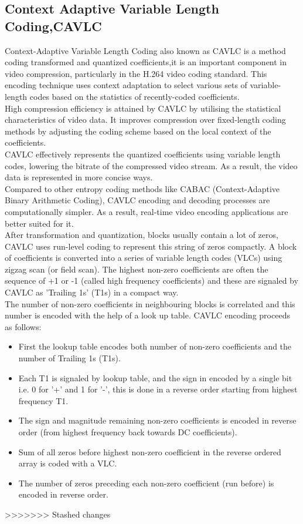 \subsection{Context Adaptive Variable Length Coding,CAVLC}
Context-Adaptive Variable Length Coding also known as CAVLC is a method coding transformed and quantized coefficients,it is an important component in video compression, particularly in the H.264 video coding standard. This encoding technique uses context adaptation to select various sets of variable-length codes based on the statistics of recently-coded coefficients.\\
High compression efficiency is attained by CAVLC by utilising the statistical characteristics of video data. It improves compression over fixed-length coding methods by adjusting the coding scheme based on the local context of the coefficients.\\
CAVLC effectively represents the quantized coefficients using variable length codes, lowering the bitrate of the compressed video stream. As a result, the video data is represented in more concise ways.\\
Compared to other entropy coding methods like CABAC (Context-Adaptive Binary Arithmetic Coding), CAVLC encoding and decoding processes are computationally simpler. As a result, real-time video encoding applications are better suited for it.\\
After transformation and quantization, blocks usually contain a lot of zeros, CAVLC uses run-level coding to represent this string of zeros compactly. A block of coefficients is converted into a series of variable length codes (VLCs) using zigzag scan (or field scan). The highest non-zero coefficients are often the sequence of +1 or -1 (called high frequency coefficients) and these are signaled by CAVLC as 'Trailing 1s' (T1s) in a compact way.\\
The number of non-zero coefficients in neighbouring blocks is correlated and this number is encoded with the help of a look up table. CAVLC encoding proceeds as follows:
\begin{itemize}
	\item First the lookup table encodes both number of non-zero coefficients and the number of Trailing 1s (T1s).
	\item Each T1 is signaled by lookup table, and the sign in encoded by a single bit i.e. 0 for '+' and 1 for '-', this is done in a reverse order starting from highest frequency T1.
	\item The sign and magnitude remaining non-zero coefficients is encoded in reverse order (from highest frequency back towards DC coefficients).
	\item Sum of all zeros before highest non-zero coefficient in the reverse ordered array is coded with a VLC.
	\item The number of zeros preceding each non-zero coefficient (run before) is encoded in reverse
	order.
\end{itemize}


>>>>>>> Stashed changes
